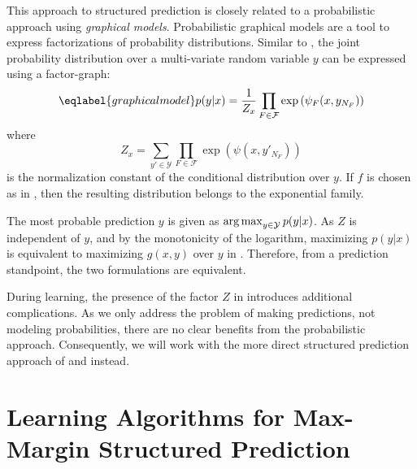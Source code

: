This approach to structured prediction is closely related to a probabilistic
approach using \emph{graphical models}.  Probabilistic graphical models are a
tool to express factorizations of probability distributions.  Similar to
, the joint probability distribution over a
multi-variate random variable $y$ can be expressed using a factor-graph:
\begin{equation}\eqlabel{graphicalmodel}
    p(y | x) = \frac{1}{Z_x}\prod_{F \in \mathcal{F}} \exp\left(\psi_F(x, y_{N_F})\right)
\end{equation}
where
\begin{equation}
    Z_x = \sum_{y' \in \mathcal{Y}} \prod_{F \in \mathcal{F}} \exp\left(\psi(x, y'_{N_F})\right)
\end{equation}
is the normalization constant of the conditional distribution over $y$.
If $f$ is chosen as in , then the resulting distribution
belongs to the exponential family.

The most probable prediction $y$ is given as $\operatorname*{arg\,max}_{y \in \mathcal{Y}}p(y|x)$.
As $Z$ is independent of $y$, and by the monotonicity of the logarithm,
maximizing $p(y|x)$ is equivalent to maximizing $g(x,y)$ over $y$ in
. Therefore, from a prediction standpoint, the two
formulations are equivalent.

During learning, the presence of the factor $Z$ in 
introduces additional complications. As we only address the problem of making
predictions, not modeling probabilities, there are no clear benefits from the
probabilistic approach.  Consequently, we will work with the more direct
structured prediction approach of  and
 instead.




\section{Learning Algorithms for Max-Margin Structured Prediction}

